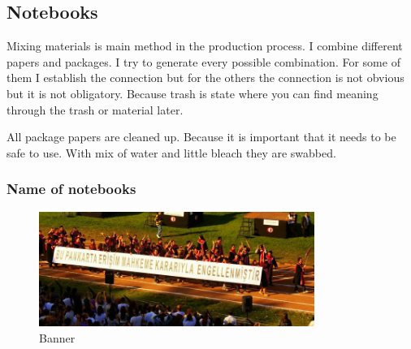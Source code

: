 \subsection{Notebooks}
Mixing materials is main method in the production process. I combine different papers and packages. I try to generate every possible combination. For some of them I establish the connection but for the others the connection is not obvious but it is not obligatory. Because trash is state where you can find meaning through the trash or material later. 

All package papers are cleaned up. Because it is important that it needs to be safe to use. With mix of water and little bleach they are swabbed. 

\subsubsection{Name of notebooks}
  \begin{figure}[ht]
      \centering
      \includegraphics[width=0.8\textwidth]{project_graphics/banner1.jpg}
      \caption{Banner}
      \label{fig:Banner_1}
  \end{figure}

